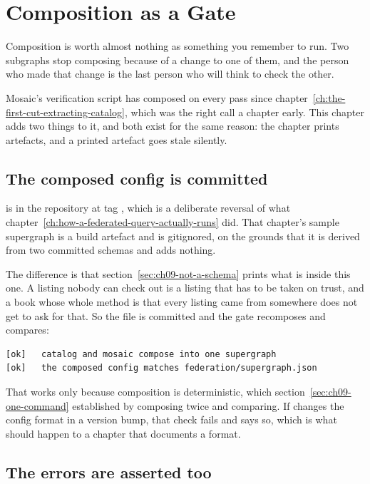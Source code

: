 \section{Composition as a Gate}
\label{sec:ch09-composition-as-a-gate}
%

Composition is worth almost nothing as something you remember to run. Two
subgraphs stop composing because of a change to one of them, and the person who
made that change is the last person who will think to check the other.

Mosaic's verification script has composed on every pass since
chapter~\ref{ch:the-first-cut-extracting-catalog}, which was the right call a
chapter early. This chapter adds two things to it, and both exist for the same
reason: the chapter prints artefacts, and a printed artefact goes stale
silently.

\subsection*{The composed config is committed}

%
 is in the repository at tag , which
is a deliberate reversal of what
chapter~\ref{ch:how-a-federated-query-actually-runs} did. That chapter's sample
supergraph is a build artefact and is gitignored, on the grounds that it is
derived from two committed schemas and adds nothing.

The difference is that section~\ref{sec:ch09-not-a-schema} prints what is inside
this one. A listing nobody can check out is a listing that has to be taken on
trust, and a book whose whole method is that every listing came from somewhere
does not get to ask for that. So the file is committed and the gate recomposes
and compares:

\begin{verbatim}
[ok]   catalog and mosaic compose into one supergraph
[ok]   the composed config matches federation/supergraph.json
\end{verbatim}

That works only because composition is deterministic, which
section~\ref{sec:ch09-one-command} established by composing twice and comparing.
If  changes the config format in a version bump, that check fails and
says so, which is what should happen to a chapter that documents a format.

\subsection*{The errors are asserted too}

